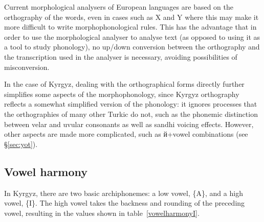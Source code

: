 \documentclass[10pt,a4paper,twocolumn]{article}
\begin{document}
Current morphological analysers of European languages are based on the orthography of the words, even in cases such as X and Y where this may make it more difficult to write morphophonological rules.  This has the advantage that in order to use the morphological analyser to analyse text (as opposed to using it as a tool to study phonology), no up/down conversion between the orthography and the transcription used in the analyser is necessary, avoiding possibilities of misconversion.

In the case of Kyrgyz, dealing with the orthographical forms directly further simplifies some aspects of the morphophonology, since Kyrgyz orthography reflects a somewhat simplified version of the phonology: it ignores processes that the orthographies of many other Turkic do not, such as the phonemic distinction between velar and uvular consonants as well as sandhi voicing effects. However, other aspects are made more complicated, such as й+vowel combinations (see §\ref{sec:yot}).

\subsection{Vowel harmony}

In Kyrgyz, there are two basic archiphonemes: a low vowel, \{A\}, and a high vowel, \{I\}.  The high vowel takes the backness and rounding of the preceding vowel, resulting in the values shown in table~\ref{vowelharmonyI}.

\begin{table}[htbp]
	\centering
	\caption{Vowel harmony for archiphoneme \{I\}}\label{vowelharmonyI}
	\hspace{2em}
\end{table}
\end{document}
